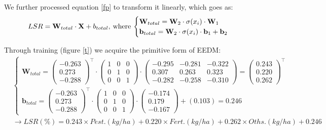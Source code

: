 \documentclass[12pt]{article}
\begin{document}
We further processed equation \ref{fp} to transform it linearly, which goes as:
\begin{equation}
	LSR = \textbf{W}_{total}\cdot\textbf{X}+b_{total},\hspace{0.2em}\text{where}\hspace{0.2em}\begin{cases}
		\textbf{W}_{total} = \textbf{W}_2\cdot\sigma(x_i)\cdot\textbf{W}_1 \\
		\textbf{b}_{total} = \textbf{W}_2\cdot\sigma(x_i)\cdot\textbf{b}_1 + \textbf{b}_2
	\end{cases}
\end{equation}

Through training (figure \ref{t}) we acquire the primitive form of EEDM:
\begin{align}
	& \begin{cases}
	\textbf{W}_{total} = \begin{pmatrix}
	-0.263 \\ 0.273 \\ -0.288
\end{pmatrix}^{\top}\cdot\begin{pmatrix}
	1 & 0 & 0 \\
	0 & 1 & 0 \\
	0 & 0 & 1
\end{pmatrix}\cdot\begin{pmatrix}
	-0.295 & -0.281 & -0.322 \\
	0.307 & 0.263 & 0.323 \\
	-0.282 & -0.258 & -0.310
\end{pmatrix}=\begin{pmatrix}
	0.243 \\ 0.220 \\ 0.262
\end{pmatrix}^{\top} \\
\textbf{b}_{total} = \begin{pmatrix}
	-0.263 \\ 0.273 \\ -0.288
\end{pmatrix}^{\top}\cdot\begin{pmatrix}
	1 & 0 & 0 \\
	0 & 1 & 0 \\
	0 & 0 & 1
\end{pmatrix}\cdot\begin{pmatrix}
-0.174 \\ 0.179 \\ -0.167
\end{pmatrix}+(0.103) = 0.246
	\end{cases} \\
	& \xrightarrow{}LSR(\%) = 0.243\times Pest.(kg/ha) + 0.220\times Fert.(kg/ha) + 0.262\times Oths.(kg/ha) + 0.246
	\label{primitive}
\end{align}
\end{document}
